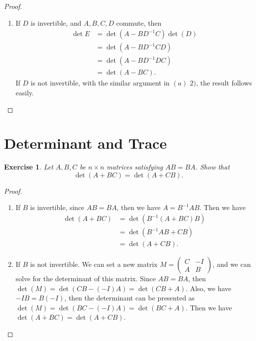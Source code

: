 \documentclass[11pt]{book}
\newtheorem{exercise}{Exercise}[section]
\theoremstyle{definition}
\numberwithin{equation}{chapter}
\begin{document}
\begin{proof}
\begin{enumerate}[label=(\alph*)]
    \item If $D$ is invertible, and $A, B, C, D$ commute, then 
    \begin{align*}
        \det E & = \det (A-BD^{-1}C) \det(D) \\
        & = \det (A-BD^{-1}CD) \\
        & = \det (A-BD^{-1}DC) \\
        & = \det (A-BC).
    \end{align*}
    If $D$ is not invertible, with the similar argument in $(a)\,\,2)$, the result follows easily.
\end{enumerate}
\end{proof}

\medskip

\section{Determinant and Trace}
\begin{exercise}
Let $A,B,C$ be $n\times n$ matrices satisfying $AB=BA$. Show that
$$
\det\left(  A+BC\right)  =\det\left(  A+CB\right).
$$
\end{exercise}
\begin{proof}
~\begin{enumerate}[label=(\alph*)]
    \item If $B$ is invertible, since $AB=BA$, then we have $A=B^{-1}AB$. Then we have
    \begin{align*}
        \det (A+BC) &= \det (B^{-1}(A+BC)B) \\
        & = \det(B^{-1}AB+CB) \\
        & = \det(A+CB).
    \end{align*}
    \item If $B$ is not invertible. We can set a new matrix $M = \begin{pmatrix}
    C & -I \\
    A & B
    \end{pmatrix}$, and we can solve for the determinant of this matrix. Since $AB=BA$, then $\det(M)=\det(CB-(-I)A)=\det(CB+A)$. Also, we have $-IB=B(-I)$, then the determinant can be presented as $\det (M)=\det(BC-(-I)A)=\det(BC+A)$. Then we have $\det(A+BC)=\det(A+CB)$. 
\end{enumerate}
\end{proof}
\end{document}
